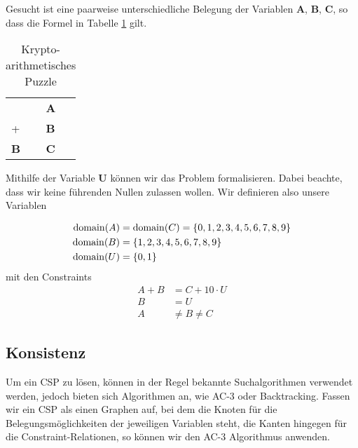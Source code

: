 \begin{beispiel}\label{cryptoarith}
	Gesucht ist eine paarweise unterschiedliche Belegung der Variablen \textbf{A}, \textbf{B}, \textbf{C}, so dass die Formel in Tabelle \ref{table:arithPuzzle} gilt.
	\begin{table}[h!]
\caption{Krypto-arithmetisches Puzzle}
		\centering
		\begin{tabular}{ll}\label{table:arithPuzzle}

		           & \textbf{A} \\
		+          & \textbf{B} \\ \hline
			\textbf{B} & \textbf{C} \\
		\end{tabular}
	\end{table}
	Mithilfe der Variable \textbf{U} können wir das Problem formalisieren. Dabei beachte, dass wir keine führenden Nullen zulassen wollen. Wir definieren also unsere Variablen

	\begin{align*}
		\operatorname{domain}(A) &= \operatorname{domain}(C) = \{0,1,2,3,4,5,6,7,8,9\} \\
		\operatorname{domain}(B) &= \{1,2,3,4,5,6,7,8,9\} \\
		\operatorname{domain}(U) &= \{0,1\}
	\end{align*} mit den Constraints
	\begin{align*}
		A + B &= C + 10 \cdot U \\
		B &= U \\
		A &\neq B \neq C
	\end{align*}
\end{beispiel}

\subsection{Konsistenz}
Um ein CSP zu lösen, können in der Regel bekannte Suchalgorithmen verwendet werden, jedoch bieten sich Algorithmen an, wie AC-3 oder Backtracking.
Fassen wir ein CSP als einen Graphen auf, bei dem die Knoten für die Belegungsmöglichkeiten der jeweiligen Variablen steht, die Kanten hingegen für die Constraint-Relationen, so können wir den AC-3 Algorithmus anwenden.

